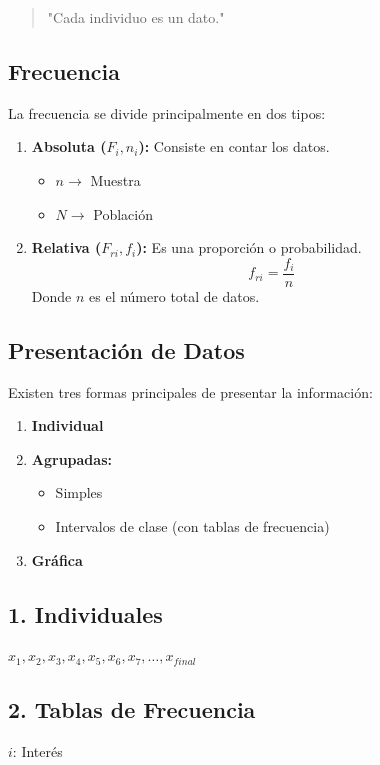 \documentclass[11pt]{article}
\begin{document}
\begin{quote}
"Cada individuo es un dato."
\end{quote}

\subsection{Frecuencia}
\label{sec:orgb49ffc1}
La frecuencia se divide principalmente en dos tipos:

\begin{enumerate}
\item \textbf{Absoluta (\(F_i, n_i\)):} Consiste en contar los datos.
\begin{itemize}
\item \(n \to\) Muestra
\item \(N \to\) Población
\end{itemize}
\item \textbf{Relativa (\(F_{ri}, f_i\)):} Es una proporción o probabilidad.
$$\displaystyle f_{ri} = \frac{f_i}{n}$$
Donde \(n\) es el número total de datos.
\end{enumerate}

\subsection{Presentación de Datos}
\label{sec:org6b37bc0}
Existen tres formas principales de presentar la información:
\begin{enumerate}
\item \textbf{Individual}
\item \textbf{Agrupadas:}
\begin{itemize}
\item Simples
\item Intervalos de clase (con tablas de frecuencia)
\end{itemize}
\item \textbf{Gráfica}
\end{enumerate}

\subsection{1. Individuales}
\label{sec:orgc4e9a88}
\(x_1, x_2, x_3, x_4, x_5, x_6, x_7, \dots, x_{final}\)

\subsection{2. Tablas de Frecuencia}
\label{sec:orgc2245f1}
\(i\): Interés
\end{document}
